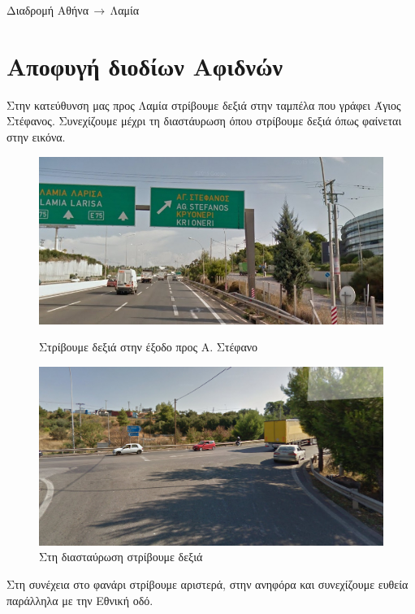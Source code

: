 \begin{center}
\begin{huge}
Διαδρομή Αθήνα$\,\to\,$Λαμία
\end{huge}
\section*{Αποφυγή διοδίων Αφιδνών}
\end{center}
Στην κατεύθυνση μας προς Λαμία στρίβουμε δεξιά στην ταμπέλα που γράφει Άγιος Στέφανος. Συνεχίζουμε μέχρι τη διαστάυρωση όπου στρίβουμε δεξιά όπως φαίνεται στην εικόνα.

\begin{figure}[hbp!]
	\centering
		\includegraphics[width=\textwidth]{images/athina-lamia/astefanos/astefanos0.png} 
			\caption{Στρίβουμε δεξιά στην έξοδο προς Α. Στέφανο}
		\includegraphics[width=\textwidth]{images/athina-lamia/astefanos/astefanos1.PNG}
			\caption{Στη διασταύρωση στρίβουμε δεξιά}
\end{figure}

Στη συνέχεια στο φανάρι στρίβουμε αριστερά, στην ανηφόρα και συνεχίζουμε ευθεία παράλληλα με την Εθνική οδό.


